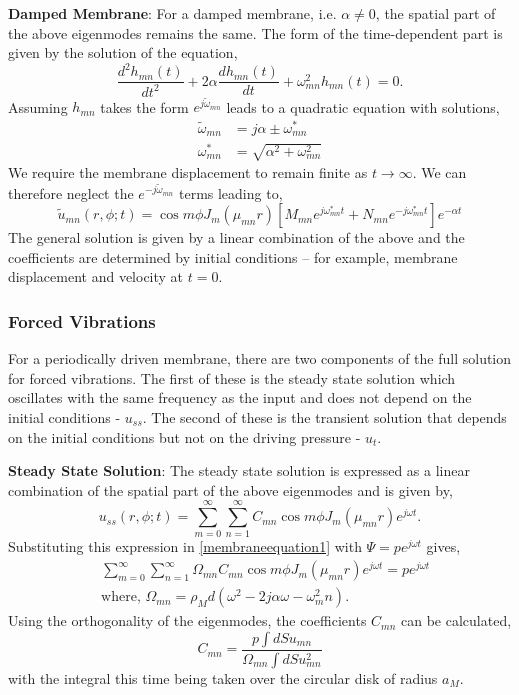 \vspace{\baselineskip}
\noindent\textbf{Damped Membrane}: For a damped membrane, i.e. $\alpha\neq 0$, the spatial part of the above eigenmodes remains the same. The form of the
time-dependent part is given by the solution of the equation,
\begin{equation}\label{dampedtimepart}
 \frac{d^2 h_{mn}(t)}{dt^2}+2\alpha \frac{d h_{mn}(t)}{dt}+\omega_{mn}^2h_{mn}(t)=0.
\end{equation}
Assuming $h_{mn}$ takes the form $e^{j\widetilde{\omega}_{mn}}$ leads to a quadratic equation with solutions,
\begin{align}
 \widetilde{\omega}_{mn}&=j\alpha\pm\omega_{mn}^*\\
 \omega_{mn}^*&=\sqrt{\alpha^2+\omega^2_{mn}}
\end{align}
We require the membrane displacement to remain finite as $t\rightarrow\infty$. We can therefore neglect the $e^{-j\widetilde{\omega}_{mn}}$ terms leading
to,
\begin{equation}\label{circularmembranedampedeigen}
 \widetilde{u}_{mn}(r,\phi;t)=\cos m\phi J_m(\mu_{mn} r)\left[M_{mn}e^{j\omega_{mn}^* t}+N_{mn}e^{-j\omega_{mn}^* t}\right]e^{-\alpha t}
\end{equation}
The general solution is given by a linear combination of the above and the coefficients are determined by initial conditions -- for example,
membrane displacement and velocity at $t=0$.
\subsubsection*{Forced Vibrations}
For a periodically driven membrane, there are two components of the full solution for forced vibrations. The first of these is the steady state solution which
oscillates with the same frequency as the input and does not depend on the initial conditions - $u_{ss}$. The second of these is the transient solution that depends
on the initial conditions but not on the driving pressure - $u_t$. 

\noindent\textbf{Steady State Solution}: The steady state solution is expressed as a linear combination of the spatial part
of the above eigenmodes and is given by,
\begin{equation}\label{membraness1}
 u_{ss}(r,\phi ;t)=\displaystyle\sum^\infty_{m=0}\sum^\infty_{n=1} C_{mn}\cos m\phi J_m(\mu_{mn} r)e^{j\omega t}.
\end{equation}
Substituting this expression in \eqref{membraneequation1} with $\Psi=pe^{j\omega t}$ gives,
\begin{align}
 &\displaystyle\sum^\infty_{m=0}\sum^\infty_{n=1} \Omega_{mn}C_{mn}\cos m\phi J_m(\mu_{mn} r)e^{j\omega t}=pe^{j\omega t}\label{membraness2}\\
 &\text{where,  }\Omega_{mn}=\rho_M d (\omega^2-2j\alpha\omega-\omega^2_mn)\label{omegafirstdef}.
\end{align}
Using the orthogonality of the eigenmodes, the coefficients $C_{mn}$ can be calculated,
\begin{equation}\label{sscoeffs}
 C_{mn}=\frac{p\int dS u_{mn}}{\Omega_{mn}\int dS u^2_{mn}}
\end{equation}
with the integral this time being taken over the circular disk of radius $a_M$.

